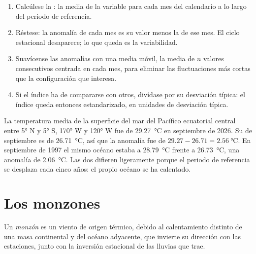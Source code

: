 \begin{method}\label{met:b2:climate-variability:index}
\begin{enumerate}
  \item Calcúlese la : la media de la variable para cada mes del calendario a lo largo del
        periodo de referencia.
  \item Réstese: la anomalía de cada mes es su valor menos la  de ese mes.
        El ciclo estacional desaparece; lo que queda es la variabilidad.
  \item Suavícense las anomalías con una media móvil, la media de $n$ valores consecutivos centrada en
        cada mes, para eliminar las fluctuaciones más cortas que la configuración que interesa.
  \item Si el índice ha de compararse con otros, divídase por su desviación típica: el índice
        queda entonces estandarizado, en unidades de desviación típica.
\end{enumerate}
\end{method}

\begin{example}\label{ex:b2:climate-variability:anomaly}
La temperatura media de la superficie del mar del Pacífico ecuatorial central entre \ang{5} N y
\ang{5} S, \ang{170} W y \ang{120} W fue de \qty{29.27}{\celsius} en septiembre de 2026. Su 
de septiembre es de \qty{26.71}{\celsius}, así que la anomalía fue de $29.27 - 26.71 = \qty{2.56}{\celsius}$.
En septiembre de 1997 el mismo océano estaba a \qty{28.79}{\celsius} frente a \qty{26.73}{\celsius}, una
anomalía de \qty{2.06}{\celsius}. Las dos  difieren ligeramente porque el periodo de referencia
se desplaza cada cinco años: el propio océano se ha calentado.
\end{example}

\section{Los monzones}\label{sec:b2:climate-variability:monsoons}

\begin{definition}[Monzón]\label{def:b2:climate-variability:monsoon}
Un \emph{monzón} es un viento de origen térmico, debido al calentamiento distinto de
una masa continental y del océano adyacente, que invierte su dirección con las estaciones, junto con
la inversión estacional de las lluvias que trae.
\end{definition}

